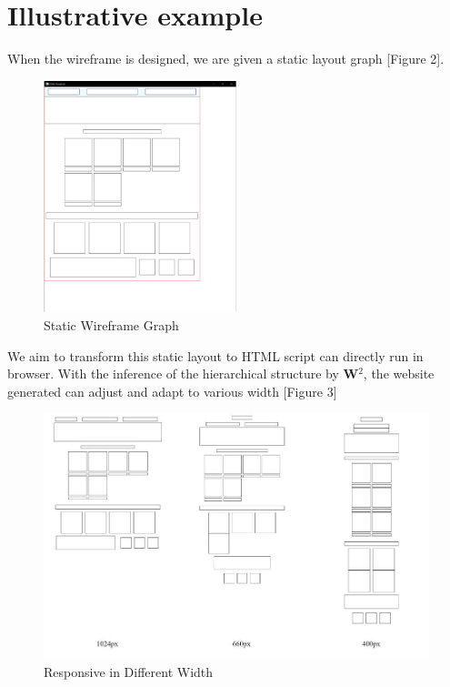 \documentclass[runningheads]{llncs}
\begin{document}
\section{Illustrative example}
When the wireframe is designed, we are given a static layout graph [Figure 2].
\begin{figure}[H]
  \vspace*{-0.1in}
  \includegraphics[width=0.5\textwidth]{src/wireframe.JPG}
  \caption{Static Wireframe Graph}
\end{figure}
We aim to transform this static layout to HTML script can directly run in browser. With the inference of the hierarchical structure by \textbf{W}$^2$, the website generated can adjust and adapt to various width [Figure 3]
\begin{figure}[H]
  \vspace*{-0.1in}
  \includegraphics[width=1\textwidth]{src/compare.jpg}
  \caption{Responsive in Different Width}
\end{figure}
\end{document}
